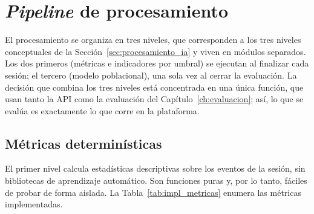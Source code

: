 \section{\textit{Pipeline} de procesamiento}
\label{sec:impl_pipeline}

El procesamiento se organiza en tres niveles, que corresponden a los tres niveles conceptuales de la Sección~\ref{sec:procesamiento_ia} y viven en módulos separados. Los dos primeros (métricas e indicadores por umbral) se ejecutan al finalizar cada sesión; el tercero (modelo poblacional), una sola vez al cerrar la evaluación. La decisión que combina los tres niveles está concentrada en una única función, que usan tanto la API como la evaluación del Capítulo~\ref{ch:evaluacion}; así, lo que se evalúa es exactamente lo que corre en la plataforma.

\subsection{Métricas determinísticas}

El primer nivel calcula estadísticas descriptivas sobre los eventos de la sesión, sin bibliotecas de aprendizaje automático. Son funciones puras y, por lo tanto, fáciles de probar de forma aislada. La Tabla~\ref{tab:impl_metricas} enumera las métricas implementadas.

